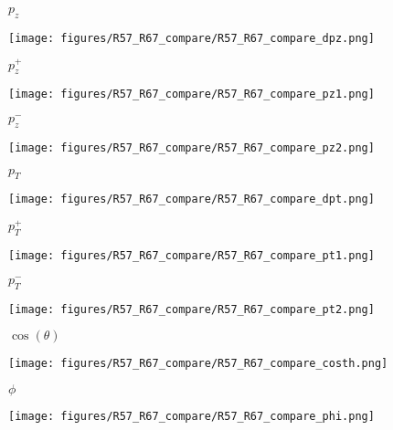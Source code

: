 \documentclass{beamer}
\begin{document}
\begin{frame}{$p_z$}
	\begin{center}
		\texttt{[image: figures/R57\_R67\_compare/R57\_R67\_compare\_dpz.png]}
	\end{center}
\end{frame}

\begin{frame}{$p_z^+$}
	\begin{center}
		\texttt{[image: figures/R57\_R67\_compare/R57\_R67\_compare\_pz1.png]}
	\end{center}
\end{frame}

\begin{frame}{$p_z^-$}
	\begin{center}
		\texttt{[image: figures/R57\_R67\_compare/R57\_R67\_compare\_pz2.png]}
	\end{center}
\end{frame}

\begin{frame}{$p_T$}
	\begin{center}
		\texttt{[image: figures/R57\_R67\_compare/R57\_R67\_compare\_dpt.png]}
	\end{center}
\end{frame}

\begin{frame}{$p_T^+$}
	\begin{center}
		\texttt{[image: figures/R57\_R67\_compare/R57\_R67\_compare\_pt1.png]}
	\end{center}
\end{frame}

\begin{frame}{$p_T^-$}
	\begin{center}
		\texttt{[image: figures/R57\_R67\_compare/R57\_R67\_compare\_pt2.png]}
	\end{center}
\end{frame}

\begin{frame}{$\cos(\theta)$}
	\begin{center}
		\texttt{[image: figures/R57\_R67\_compare/R57\_R67\_compare\_costh.png]}
	\end{center}
\end{frame}

\begin{frame}{$\phi$}
	\begin{center}
		\texttt{[image: figures/R57\_R67\_compare/R57\_R67\_compare\_phi.png]}
	\end{center}
\end{frame}
\end{document}
